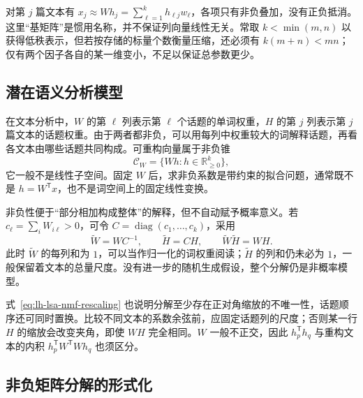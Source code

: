 对第 $j$ 篇文本有 $x_j\approx Wh_j=\sum_{\ell=1}^k h_{\ell j}w_\ell$，各项只有非负叠加，没有正负抵消。这里“基矩阵”是惯用名称，并不保证列向量线性无关。常取 $k<\min(m,n)$ 以获得低秩表示，但若按存储的标量个数衡量压缩，还必须有 $k(m+n)<mn$；仅有两个因子各自的某一维变小，不足以保证总参数更少。

\subsection{潜在语义分析模型}
\label{subsec:lh-lsa-nmf-topic-model}

在文本分析中，$W$ 的第 $\ell$ 列表示第 $\ell$ 个话题的单词权重，$H$ 的第 $j$ 列表示第 $j$ 篇文本的话题权重。由于两者都非负，可以用每列中权重较大的词解释话题，再看各文本由哪些话题共同构成。可重构向量属于非负锥
\begin{equation}
\mathcal C_W=\{Wh:h\in\mathbb R_{\geq0}^k\},
\label{eq:lh-lsa-nmf-cone}
\end{equation}
它一般不是线性子空间。固定 $W$ 后，求非负系数是带约束的拟合问题，通常既不是 $h=W^{\mathsf T}x$，也不是词空间上的固定线性变换。

非负性便于“部分相加构成整体”的解释，但不自动赋予概率意义。若 $c_\ell=\sum_iW_{i\ell}>0$，可令 $C=\operatorname{diag}(c_1,\ldots,c_k)$，采用
\begin{equation}
\widetilde W=WC^{-1},\qquad
\widetilde H=CH,\qquad
\widetilde W\widetilde H=WH.
\label{eq:lh-lsa-nmf-rescaling}
\end{equation}
此时 $\widetilde W$ 的每列和为 $1$，可以当作归一化的词权重阅读；$\widetilde H$ 的列和仍未必为 $1$，一般保留着文本的总量尺度。没有进一步的随机生成假设，整个分解仍是非概率模型。

式~\eqref{eq:lh-lsa-nmf-rescaling} 也说明分解至少存在正对角缩放的不唯一性，话题顺序还可同时置换。比较不同文本的系数余弦前，应固定话题列的尺度；否则某一行 $H$ 的缩放会改变夹角，即使 $WH$ 完全相同。$W$ 一般不正交，因此 $h_p^{\mathsf T}h_q$ 与重构文本的内积 $h_p^{\mathsf T}W^{\mathsf T}Wh_q$ 也须区分。

\subsection{非负矩阵分解的形式化}
\label{subsec:lh-lsa-nmf-objectives}

